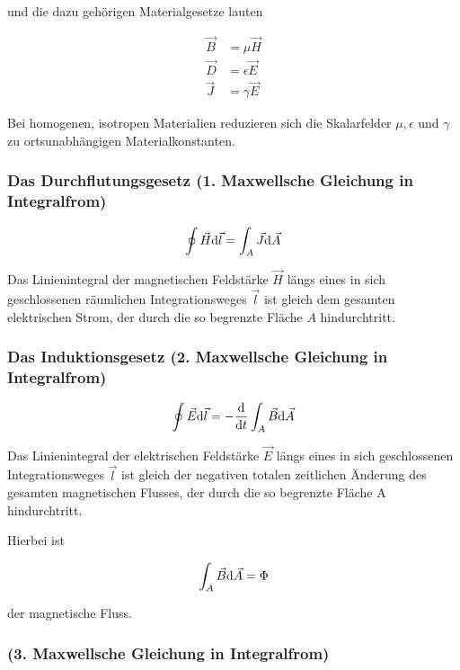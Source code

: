 und die dazu gehörigen Materialgesetze lauten

\begin{align*}
\vec{B} &= \mu\vec{H}\\
\vec{D}	&= \epsilon\vec{E}\\
\vec{J} &= \gamma\vec{E}
\end{align*}

Bei homogenen, isotropen Materialien reduzieren sich die Skalarfelder $\mu, \epsilon$ und $\gamma$ zu ortsunabhängigen Materialkonstanten.

\subsubsection{Das Durchflutungsgesetz (1. Maxwellsche Gleichung in Integralfrom)}

\begin{align}
\oint \vec{H}\mathrm{d}\vec{l} = \int_A \vec{J}\mathrm{d}\vec{A}
\end{align}

Das Linienintegral der magnetischen Feldstärke $\vec{H}$ längs eines in sich geschlossenen räumlichen Integrationsweges $\vec{l}$ ist gleich dem gesamten elektrischen Strom, der durch die so begrenzte Fläche $A$ hindurchtritt.

\subsubsection{Das Induktionsgesetz (2. Maxwellsche Gleichung in Integralfrom)}

\begin{align}
\oint \vec{E}\mathrm{d}\vec{l} = -\frac{\mathrm{d}}{\mathrm{d}t}\int_A \vec{B}\mathrm{d}\vec{A}
\end{align}

Das Linienintegral der elektrischen Feldstärke $\vec{E}$ längs eines in sich geschlossenen Integrationsweges $\vec{l}$ ist gleich der negativen totalen zeitlichen Änderung des gesamten magnetischen Flusses, der durch die so begrenzte Fläche A hindurchtritt.

Hierbei ist

\begin{align}
\int_A \vec{B}\mathrm{d}\vec{A} = \Phi
\end{align}

der magnetische Fluss.

\subsubsection{(3. Maxwellsche Gleichung in Integralfrom)}

